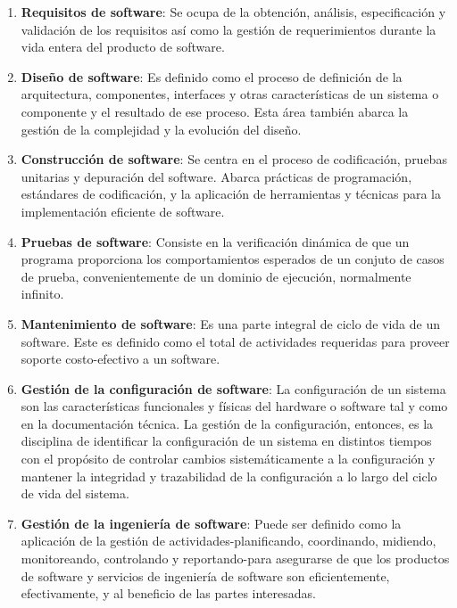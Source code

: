 \documentclass[11pt, a4paper]{article} %
\begin{document}
    \begin{enumerate}
        \item \textbf{Requisitos de software}: Se ocupa de la obtención, análisis, especificación
            y validación de los requisitos así como la gestión de requerimientos durante la
            vida entera del producto de software.

        \item \textbf{Diseño de software}: Es definido como el proceso de definición de la
            arquitectura, componentes, interfaces y otras características de un sistema o componente
            y el resultado de ese proceso. Esta área también abarca la gestión de la
            complejidad y la evolución del diseño.

        \item \textbf{Construcción de software}: Se centra en el proceso de codificación,
            pruebas unitarias y depuración del software. Abarca prácticas de programación,
            estándares de codificación, y la aplicación de herramientas y técnicas para la
            implementación eficiente de software.

        \item \textbf{Pruebas de software}: Consiste en la verificación dinámica de que un
            programa proporciona los comportamientos esperados de un conjuto de casos de prueba,
            convenientemente de un dominio de ejecución, normalmente infinito.

        \item \textbf{Mantenimiento de software}: Es una parte integral de ciclo de vida de
            un software. Este es definido como el total de actividades requeridas para
            proveer soporte costo-efectivo a un software.

        \item \textbf{Gestión de la configuración de software}: La configuración de un sistema
            son las características funcionales y físicas del hardware o software tal y como
            en la documentación técnica. La gestión de la configuración, entonces, es la
            disciplina de identificar la configuración de un sistema en distintos tiempos
            con el propósito de controlar cambios sistemáticamente a la configuración y
            mantener la integridad y trazabilidad de la configuración a lo largo del ciclo
            de vida del sistema.

        \item \textbf{Gestión de la ingeniería de software}: Puede ser definido como la aplicación
            de la gestión de actividades-planificando, coordinando, midiendo, monitoreando,
            controlando y reportando-para asegurarse de que los productos de software y servicios
            de ingeniería de software son eficientemente, efectivamente, y al beneficio de
            las partes interesadas.


\end{enumerate}
\end{document}
